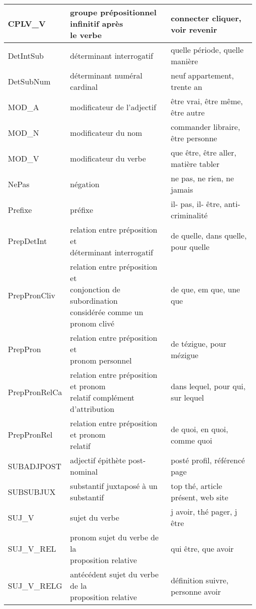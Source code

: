 \documentclass[oneside,parskip]{scrbook}
\makeatletter
\newcommand{\specialcell}[2][l]{%
      \begin{tabular}[#1]{@{}l@{}}#2\end{tabular}}
\makeatother
\begin{document}
\begin{longtable}{lll}
    CPLV\_V       &  \specialcell{groupe prépositionnel infinitif après \\ le verbe} & connecter cliquer, voir revenir \\ \midrule
    DetIntSub     &  déterminant interrogatif              & quelle période, quelle manière \\ \midrule
    DetSubNum     &  déterminant numéral cardinal          & neuf appartement, trente an \\ \midrule
    MOD\_A        &  modificateur de l'adjectif            & être vrai, être même, être autre \\ \midrule
    MOD\_N        &  modificateur du nom                   & commander libraire, être personne  \\ \midrule
    MOD\_V        &  modificateur du verbe                 & que être, être aller, matière tabler \\ \midrule
    NePas         &  négation                              & ne pas, ne rien, ne jamais \\ \midrule
    Prefixe       &  préfixe                               & il- pas, il- être, anti-criminalité \\ \midrule
    PrepDetInt    &  \specialcell{relation entre préposition et \\ déterminant interrogatif} & de quelle, dans quelle, pour quelle \\ \midrule
    PrepPronCliv  &  \specialcell{relation entre préposition et \\ conjonction de subordination \\ considérée comme un pronom clivé} & de que, em que, une que \\ \midrule
    PrepPron      &  \specialcell{relation entre préposition et \\ pronom personnel} & de tézigue, pour mézigue \\ \midrule
    PrepPronRelCa &  \specialcell{relation entre préposition et pronom \\ relatif complément d'attribution} & dans lequel, pour qui, sur lequel  \\ \midrule
    PrepPronRel   &  \specialcell{relation entre préposition et pronom \\ relatif} & de quoi, en quoi, comme quoi \\ \midrule
    SUBADJPOST    &  adjectif épithète post-nominal        & posté profil, référencé page \\ \midrule
    SUBSUBJUX     &  substantif juxtaposé à un substantif  & top thé, article présent, web site \\ \midrule
    SUJ\_V        &  sujet du verbe                        & j avoir, thé pager, j être \\ \midrule
    SUJ\_V\_REL   &  \specialcell{pronom sujet du verbe de la \\ proposition relative} & qui être, que avoir \\ \midrule
    SUJ\_V\_RELG  &  \specialcell{antécédent sujet du verbe de la \\ proposition relative} & définition suivre, personne avoir \\
    \bottomrule


\end{longtable}
\end{document}

